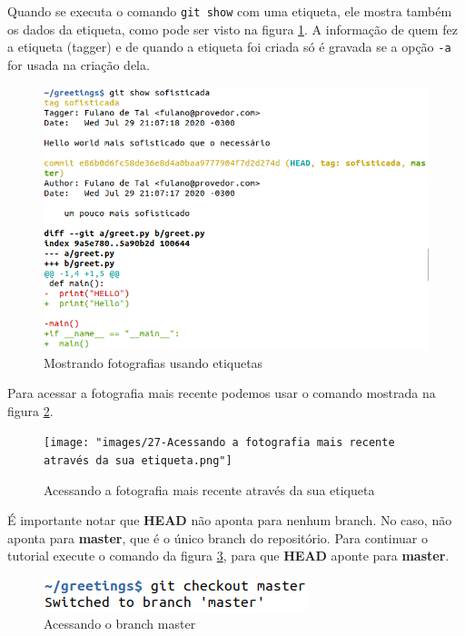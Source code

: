 \documentclass[a4paper]{book}
\begin{document}

Quando se executa o comando \texttt{git show} com uma etiqueta,
ele mostra também os dados da etiqueta, como pode ser visto na
figura \ref{fig:24}.
A informação de quem fez a etiqueta (tagger) e de quando 
a etiqueta foi criada só é gravada se a opção \texttt{-a}
for usada na criação dela.

\begin{figure}[h!]
\caption{Mostrando fotografias usando etiquetas}
\label{fig:24}
\centering
\includegraphics[scale=0.6]{"images/24-Mostrando fotografias usando etiquetas.png"}
\end{figure}


Para acessar a fotografia mais recente podemos usar o 
comando mostrada na figura \ref{fig:27}.

\begin{figure}[ht]
\caption{Acessando a fotografia mais recente através da sua etiqueta}
\label{fig:27}
\centering
\texttt{[image: "images/27-Acessando a fotografia mais recente através da sua etiqueta.png"]}
\end{figure}

É importante notar que \textbf{HEAD} não aponta para nenhum
branch. No caso, não aponta para \textbf{master}, que é 
o único branch do repositório.
Para continuar o tutorial execute o comando da
figura \ref{fig:29}, para que \textbf{HEAD} aponte para 
\textbf{master}.

\begin{figure}[ht]
\caption{Acessando o branch master}
\label{fig:29}
\centering
\includegraphics[scale=0.6]{"images/29-Acessando o branch master.png"}
\end{figure}
\end{document}
